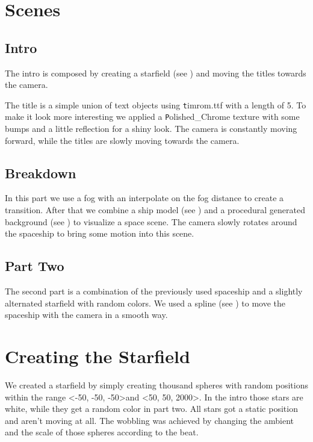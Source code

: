 \documentclass[a4paper, 12pt]{scrartcl}
\begin{document}
    \section{Scenes}
    \subsection{Intro}

    The intro is composed by creating a starfield (see ) and moving the
    titles towards the camera.

    The title is a simple union of text objects using \texttt timrom.ttf with a length of 5. To
    make it look more interesting we applied a \texttt Polished\_Chrome texture with some bumps and
    a little reflection for a shiny look. The camera is constantly moving forward, while the titles
    are slowly moving towards the camera.

    \subsection{Breakdown}

    In this part we use a fog with an interpolate on the fog distance to create a transition.
    After that we combine a ship model (see ) and a procedural generated
    background (see ) to visualize a space scene.  The camera slowly
    rotates around the spaceship to bring some motion into this scene.

    \subsection{Part Two}

    The second part is a combination of the previously used spaceship and a slightly alternated
    starfield with random colors. We used a spline (see ) to move the spaceship
    with the camera in a smooth way.

    \section{Creating the Starfield}
    \label{sec:starfield}

    We created a starfield by simply creating thousand spheres with random
    positions within the range \textless-50, -50, -50\textgreater and \textless50, 50,
    2000\textgreater. In the intro those stars are white, while they get a random color in part
    two. All stars got a static position and aren't moving at all.  The wobbling was achieved by
    changing the ambient and the scale of those spheres according to the beat.
\end{document}
